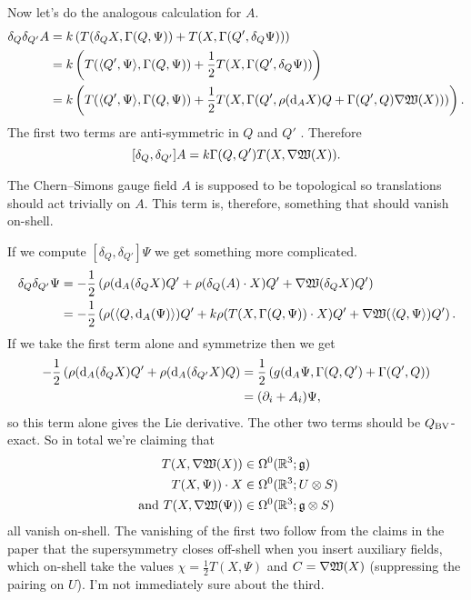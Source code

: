\documentclass[10pt, oneside]{article}
\begin{document}
Now let's do the analogous calculation for $A$.
\begin{align*}
\delta_{Q} \delta_{Q'}A &= k \left( T(\delta_Q X, \Gamma( Q, \Psi )) + T(X, \Gamma( Q', \delta_{Q}\Psi )) \right) \\
&= k \left( T(\langle Q', \Psi \rangle, \Gamma( Q, \Psi )) + \frac 12T(X, \Gamma( Q', \delta_{Q}\Psi )) \right) \\
&= k \left( T(\langle Q', \Psi \rangle, \Gamma( Q, \Psi )) + \frac 12T(X, \Gamma( Q', \rho({\rm d}_A X)Q + \Gamma(Q',Q)\nabla \mathfrak{W}(X)))\right).
\end{align*}
The first two terms are anti-symmetric in $Q$ and $Q'$ .  Therefore
\[[\delta_Q,\delta_{Q'}]A = k\Gamma(Q,Q')T(X, \nabla \mathfrak{W}(X)).\]

The Chern--Simons gauge field $A$ is supposed to be topological so translations should act trivially on $A$.  This term is, therefore, something that should vanish on-shell.

If we compute $[\delta_Q, \delta_{Q'}]\Psi$ we get something more complicated.  
\begin{align*}
\delta_{Q} \delta_{Q'}\Psi &=-\frac 12\left( \rho({\rm d}_A (\delta_Q X)Q' + \rho(\delta_Q(A)\cdot X)Q' + \nabla \mathfrak{W}(\delta_Q X)Q' \right) \\
&= -\frac 12\left( \rho(\langle Q, {\rm d}_A(\Psi)\rangle)Q' + k \rho(T(X, \Gamma( Q, \Psi ))\cdot X)Q' + \nabla \mathfrak{W}(\langle Q, \Psi\rangle)Q' \right).
\end{align*}
If we take the first term alone and symmetrize then we get
\begin{align*}
-\frac 12 \left(\rho({\rm d}_A (\delta_Q X)Q' + \rho({\rm d}_A (\delta_{Q'} X)Q \right) &= \frac 12\left( g({\rm d}_A \Psi, \Gamma(Q, Q') + \Gamma(Q',Q)\right) \\
&= (\partial_i + A_i)\Psi,
\end{align*}
so this term alone gives the Lie derivative.  The other two terms should be $Q_{\mathrm{BV}}$-exact.  So in total we're claiming that
\begin{align*}
T(X, \nabla \mathfrak{W}(X)) &\in \Omega^0(\mathbb R^3; \mathfrak{g}) \\\
T(X, \Psi ))\cdot X &\in \Omega^0(\mathbb R^3;U \otimes S) \\
\text{ and } T(X, \nabla \mathfrak{W}(\Psi)) &\in \Omega^0(\mathbb R^3; \mathfrak{g} \otimes S) 
\end{align*}
all vanish on-shell.  The vanishing of the first two follow from the claims in the paper that the supersymmetry closes off-shell when you insert auxiliary fields, which on-shell take the values $\chi = \frac 12 T(X,\Psi)$ and $C = \nabla \mathfrak{W}(X)$ (suppressing the pairing on $U$).  I'm not immediately sure about the third.
\end{document}

